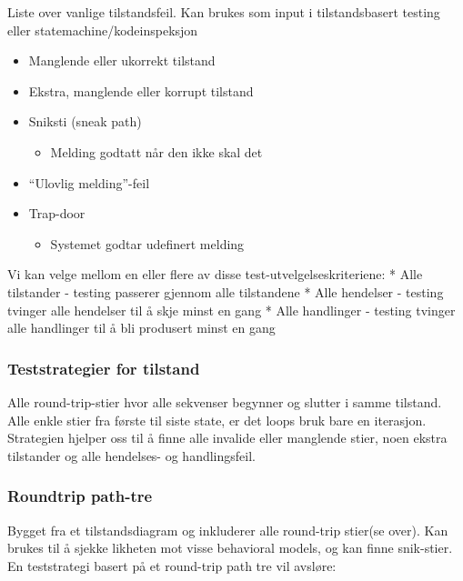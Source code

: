 Liste over vanlige tilstandsfeil. Kan brukes som input i tilstandsbasert
testing eller statemachine/kodeinspeksjon

\begin{itemize}
\item
  Manglende eller ukorrekt tilstand
\item
  Ekstra, manglende eller korrupt tilstand
\item
  Sniksti (sneak path)
  \begin{itemize}
  \item
    Melding godtatt når den ikke skal det
  \end{itemize}
\item
  ``Ulovlig melding''-feil
\item
  Trap-door
  \begin{itemize}
  \item
    Systemet godtar udefinert melding
  \end{itemize}
\end{itemize}
Vi kan velge mellom en eller flere av disse test-utvelgelseskriteriene:
* Alle tilstander - testing passerer gjennom alle tilstandene * Alle
hendelser - testing tvinger alle hendelser til å skje minst en gang *
Alle handlinger - testing tvinger alle handlinger til å bli produsert
minst en gang

\subsubsection{Teststrategier for tilstand}

Alle round-trip-stier hvor alle sekvenser begynner og slutter i samme
tilstand. Alle enkle stier fra første til siste state, er det loops bruk
bare en iterasjon. Strategien hjelper oss til å finne alle invalide
eller manglende stier, noen ekstra tilstander og alle hendelses- og
handlingsfeil.

\subsubsection{Roundtrip path-tre}

Bygget fra et tilstandsdiagram og inkluderer alle round-trip stier(se
over). Kan brukes til å sjekke likheten mot visse behavioral models, og
kan finne snik-stier. En teststrategi basert på et round-trip path tre
vil avsløre:


